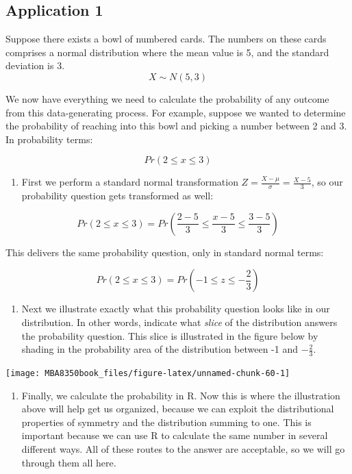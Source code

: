\documentclass[
]{book}
\providecommand{\tightlist}{%
  \setlength{\itemsep}{0pt}\setlength{\parskip}{0pt}}
\begin{document}
\hypertarget{application-1}{%
\subsection{Application 1}\label{application-1}}

Suppose there exists a bowl of numbered cards. The numbers on these cards comprises a normal distribution where the mean value is 5, and the standard deviation is 3.
\[X \sim N(5,3)\]

We now have everything we need to calculate the probability of any outcome from this data-generating process. For example, suppose we wanted to determine the probability of reaching into this bowl and picking a number between 2 and 3. In probability terms:

\[Pr(2 \leq x \leq 3)\]

\begin{enumerate}
\def\labelenumi{\arabic{enumi}.}
\tightlist
\item
  First we perform a standard normal transformation \(Z=\frac{X-\mu}{\sigma}=\frac{X-5}{3}\), so our probability question gets transformed as well:
\end{enumerate}

\[Pr(2 \leq x \leq 3)=Pr\left(\frac{2-5}{3} \leq \frac{x-5}{3} \leq \frac{3-5}{3}\right)\]

This delivers the same probability question, only in standard normal terms:

\[Pr(2 \leq x \leq 3)=Pr\left(-1 \leq z \leq -\frac{2}{3}\right)\]

\begin{enumerate}
\def\labelenumi{\arabic{enumi}.}
\setcounter{enumi}{1}
\tightlist
\item
  Next we illustrate exactly what this probability question looks like in our distribution. In other words, indicate what \emph{slice} of the distribution answers the probability question. This slice is illustrated in the figure below by shading in the probability area of the distribution between -1 and \(-\frac{2}{3}\).
\end{enumerate}

\begin{center}\texttt{[image: MBA8350book\_files/figure-latex/unnamed-chunk-60-1]} \end{center}

\begin{enumerate}
\def\labelenumi{\arabic{enumi}.}
\setcounter{enumi}{2}
\tightlist
\item
  Finally, we calculate the probability in R. Now this is where the illustration above will help get us organized, because we can exploit the distributional properties of symmetry and the distribution summing to one. This is important because we can use R to calculate the same number in several different ways. All of these routes to the answer are acceptable, so we will go through them all here.
\end{enumerate}
\end{document}
